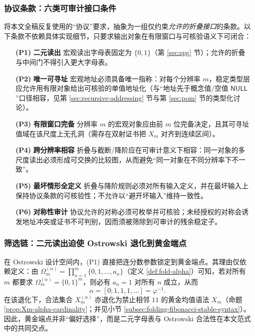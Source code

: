 \subsubsection{协议条款：六类可审计接口条件}
将本文全稿反复使用的“协议”要求，抽象为一组仅约束\emph{允许的折叠接口}的条款。以下条款不依赖具体实现细节，只要求输出对象在有限窗口与可核验语义下可闭合：
\begin{enumerate}
  \item[\textbf{(P1)} \textbf{二元读出}] 宏观读出字母表固定为 \(\{0,1\}\)（第 \ref{sec:spg} 节）；允许的折叠与中间门不得引入更大字母表。
  \item[\textbf{(P2)} \textbf{唯一可寻址}] 宏观地址必须具备唯一指称：对每个分辨率 \(m\)，稳定类型层应允许用有限对象给出可核验的单值地址化（与“地址先于概念值/空值 \(\mathsf{NULL}\)”口径相容，见第 \ref{sec:recursive-addressing} 节与第 \ref{sec:pom} 节的类型化讨论）。
  \item[\textbf{(P3)} \textbf{有限窗口完备}] 分辨率 \(m\) 的宏观对象应由前 \(m\) 位完备决定，且其可寻址值域在该尺度上无孔洞（需存在双射证书把 \(X_m\) 对齐到连续区间）。
  \item[\textbf{(P4)} \textbf{跨分辨率相容}] 折叠与截断/降阶应在可审计意义下相容：同一对象的多尺度读出必须形成可交换的比较图，从而避免“同一对象在不同分辨率下不一致”。
  \item[\textbf{(P5)} \textbf{最坏情形全定义}] 折叠与降阶规则必须对所有输入定义，并在最坏输入上保持协议条款的可核验性；不允许以“避开坏输入”维持一致性。
  \item[\textbf{(P6)} \textbf{对称性审计}] 协议允许的对称必须可枚举并可核验；未经授权的对称会诱发地址冲突或证书不可判别，因而须被筛除到可审计的残余稳定子。
\end{enumerate}

\subsubsection{筛选链：二元读出迫使 Ostrowski 退化到黄金端点}
在 Ostrowski 设计空间内，(P1) 直接把连分数参数锁定到黄金端点。其理由仅依赖定义：由 \(\Omega_m^{(\alpha)}=\prod_{n=1}^{m}\{0,1,\dots,a_n\}\)（定义 \ref{def:fold-alpha}）可知，若对所有 \(m\) 都要求 \(\Omega_m^{(\alpha)}=\{0,1\}^m\)，则必有 \(a_n=1\) 对所有 \(n\) 成立，从而
\[
\alpha=[0;1,1,1,\dots]=\varphi^{-1}.
\]
在该退化下，合法集合 \(X_m^{(\alpha)}\) 亦退化为禁止相邻 \(11\) 的黄金均值语法 \(X_m\)（命题 \ref{prop:Xm-alpha-cardinality}；并见小节 \ref{subsec:folding-fibonacci-stable-syntax}）。因此，黄金端点并非“偏好选择”，而是二元字母表与 Ostrowski 合法性在本文范式中的共同交点。

